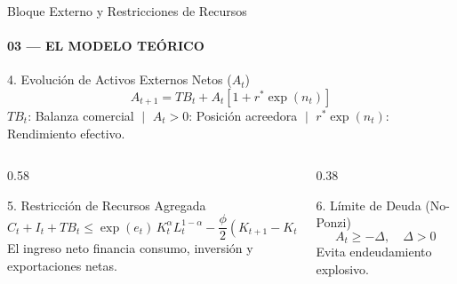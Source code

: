 \documentclass[aspectratio=169, 10pt]{beamer}
\begin{document}
\begin{frame}{Bloque Externo y Restricciones de Recursos}
    \framesubtitle{03 --- EL MODELO TEÓRICO}

    \begin{block}{4. Evolución de Activos Externos Netos ($A_t$)}
        \small
        \begin{equation}
            A_{t+1} = TB_t + A_t\left[1 + r^{*}\exp(n_t)\right]
        \end{equation}
        \scriptsize $TB_t$: Balanza comercial $\;\vert\;$ $A_t > 0$: Posición acreedora $\;\vert\;$ $r^*\exp(n_t)$: Rendimiento efectivo.
    \end{block}

    \begin{columns}[T]
        \begin{column}{0.58\textwidth}
            \begin{block}{5. Restricción de Recursos Agregada}
                \small
                \begin{equation}
                    C_t + I_t + TB_t \leq \exp(e_t)\,K_t^{\alpha} L_t^{1-\alpha} - \frac{\phi}{2}\left(K_{t+1}-K_t\right)^{2}
                \end{equation}
                \scriptsize El ingreso neto financia consumo, inversión y exportaciones netas.
            \end{block}
        \end{column}
        \begin{column}{0.38\textwidth}
            \begin{block}{6. Límite de Deuda (No-Ponzi)}
                \small
                \begin{equation}
                    A_t \geq -\Delta, \quad \Delta > 0
                \end{equation}
                \scriptsize Evita endeudamiento explosivo.
            \end{block}
        \end{column}
    \end{columns}
\end{frame}
\end{document}
